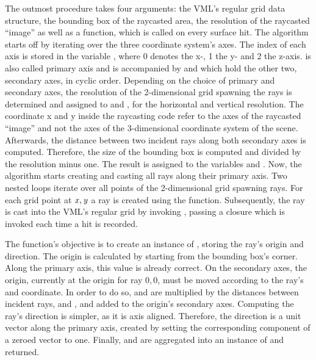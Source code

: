 %
The outmost procedure  takes four arguments: the VML's regular grid data structure, the bounding box of the raycasted area, the resolution of the raycasted \enquote{image} as well as a function, which is called on every surface hit.
The algorithm starts off by iterating over the three coordinate system's axes.
The index of each axis is stored in the variable , where 0 denotes the x-, 1 the y- and 2 the z-axis.
 is also called primary axis and is accompanied by  and  which hold the other two, secondary axes, in cyclic order.
Depending on the choice of primary and secondary axes, the resolution of the 2-dimensional grid spawning the rays is determined and assigned to  and , for the horizontal and vertical resolution.
The coordinate x and y inside the raycasting code refer to the axes of the raycasted \enquote{image} and not the axes of the 3-dimensional coordinate system of the scene.
Afterwards, the distance between two incident rays along both secondary axes is computed.
Therefore, the size of the bounding box is computed and divided by the resolution minus one.
The result is assigned to the variables  and .
Now, the algorithm starts creating and casting all rays along their primary axis.
Two nested loops iterate over all points of the 2-dimensional grid spawning rays.
For each grid point at $\mathit{x}, \mathit{y}$ a ray is created using the  function.
Subsequently, the ray is cast into the VML's regular grid by invoking , passing a closure which is invoked each time a hit is recorded.

The  function's objective is to create an instance of , storing the ray's origin and direction.
The origin is calculated by starting from the bounding box's  corner.
Along the primary axis, this value is already correct.
On the secondary axes, the origin, currently at the origin for ray $0, 0$, must be moved according to the ray's  and  coordinate.
In order to do so,  and  are multiplied by the distances between incident rays,  and , and added to the origin's secondary axes.
%
Computing the ray's direction is simpler, as it is axis aligned.
Therefore, the direction is a unit vector along the primary axis, created by setting the corresponding component of a zeroed vector to one.
%
Finally,  and  are aggregated into an instance of  and returned.

